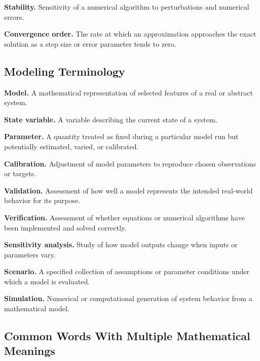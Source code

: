 \textbf{Stability.}
Sensitivity of a numerical algorithm to perturbations and numerical errors.

\medskip

\textbf{Convergence order.}
The rate at which an approximation approaches the exact solution as a step
size or error parameter tends to zero.

\subsection{Modeling Terminology}
\label{subsec:modeling-terminology-reference}

\textbf{Model.}
A mathematical representation of selected features of a real or abstract
system.

\medskip

\textbf{State variable.}
A variable describing the current state of a system.

\medskip

\textbf{Parameter.}
A quantity treated as fixed during a particular model run but potentially
estimated, varied, or calibrated.

\medskip

\textbf{Calibration.}
Adjustment of model parameters to reproduce chosen observations or targets.

\medskip

\textbf{Validation.}
Assessment of how well a model represents the intended real-world behavior
for its purpose.

\medskip

\textbf{Verification.}
Assessment of whether equations or numerical algorithms have been implemented
and solved correctly.

\medskip

\textbf{Sensitivity analysis.}
Study of how model outputs change when inputs or parameters vary.

\medskip

\textbf{Scenario.}
A specified collection of assumptions or parameter conditions under which a
model is evaluated.

\medskip

\textbf{Simulation.}
Numerical or computational generation of system behavior from a mathematical
model.

\subsection{Common Words With Multiple Mathematical Meanings}
\label{subsec:multiple-meaning-math-terms}

